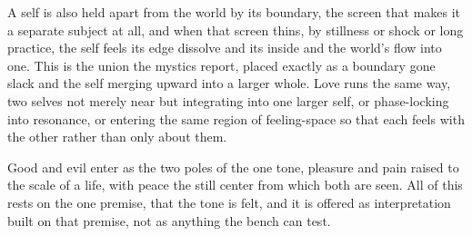 A self is also held apart from the world by its boundary, the screen that makes it a separate subject at all, and when that screen thins, by stillness or shock or long practice, the self feels its edge dissolve and its inside and the world's flow into one. This is the union the mystics report, placed exactly as a boundary gone slack and the self merging upward into a larger whole. Love runs the same way, two selves not merely near but integrating into one larger self, or phase-locking into resonance, or entering the same region of feeling-space so that each feels with the other rather than only about them.

Good and evil enter as the two poles of the one tone, pleasure and pain raised to the scale of a life, with peace the still center from which both are seen. All of this rests on the one premise, that the tone is felt, and it is offered as interpretation built on that premise, not as anything the bench can test.
